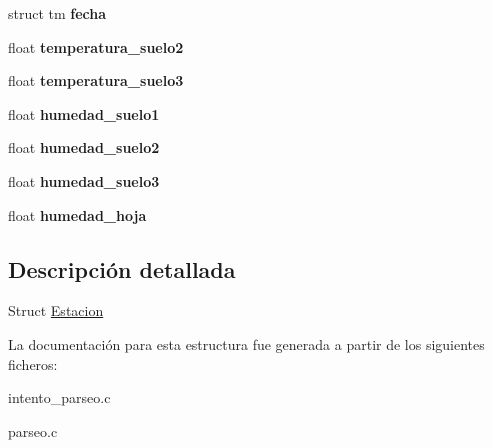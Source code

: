 \begin{DoxyCompactItemize}
\item 
struct tm {\bfseries fecha}\hypertarget{structEstacion_a78eab8af86561db3336b903326e16dba}{}\label{structEstacion_a78eab8af86561db3336b903326e16dba}

\item 
float {\bfseries temperatura\+\_\+suelo2}\hypertarget{structEstacion_a8e3a551a528e443fa32017fce129f8c9}{}\label{structEstacion_a8e3a551a528e443fa32017fce129f8c9}

\item 
float {\bfseries temperatura\+\_\+suelo3}\hypertarget{structEstacion_a55847d706bb524d4d73d46512c01ebae}{}\label{structEstacion_a55847d706bb524d4d73d46512c01ebae}

\item 
float {\bfseries humedad\+\_\+suelo1}\hypertarget{structEstacion_a661695c88c935c75b3fc1c587de2b96b}{}\label{structEstacion_a661695c88c935c75b3fc1c587de2b96b}

\item 
float {\bfseries humedad\+\_\+suelo2}\hypertarget{structEstacion_a94f3c12aad7eb6090d4bc0a9e18bc9a5}{}\label{structEstacion_a94f3c12aad7eb6090d4bc0a9e18bc9a5}

\item 
float {\bfseries humedad\+\_\+suelo3}\hypertarget{structEstacion_ac9fb6a2111e5913e3072bf4ccb84af22}{}\label{structEstacion_ac9fb6a2111e5913e3072bf4ccb84af22}

\item 
float {\bfseries humedad\+\_\+hoja}\hypertarget{structEstacion_a7b7aa8ebd19f23bffc5f090288458734}{}\label{structEstacion_a7b7aa8ebd19f23bffc5f090288458734}

\end{DoxyCompactItemize}


\subsection{Descripción detallada}
Struct \hyperlink{structEstacion}{Estacion} 

La documentación para esta estructura fue generada a partir de los siguientes ficheros\+:\begin{DoxyCompactItemize}
\item 
intento\+\_\+parseo.\+c\item 
parseo.\+c\end{DoxyCompactItemize}

